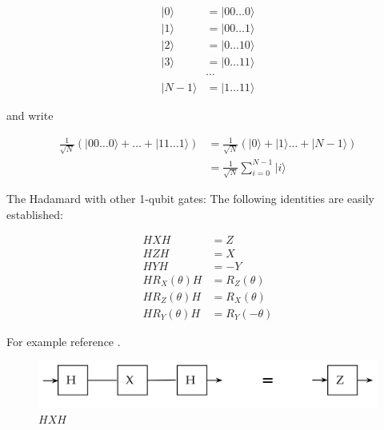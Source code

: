 \documentclass[main.tex]{subfiles}
\begin{document}
    $$
    \begin{aligned}
        |0\rangle & =|00 \ldots 0\rangle\\
        |1\rangle & =|00 \ldots 1\rangle\\
        |2\rangle & =|0 \ldots 10\rangle\\
        |3\rangle & =|0 \ldots 11\rangle\\
                & \cdots \\
        |N-1\rangle & =|1 \ldots 11\rangle
    \end{aligned}
    $$
    
    and write
    
    $$
    \begin{aligned}
    \frac{1}{\sqrt{N}}(|00 \ldots 0\rangle+\ldots+|11 \ldots 1\rangle) &=\frac{1}{\sqrt{N}}(|0\rangle+|1\rangle \ldots+|N-1\rangle) \\
    &=\frac{1}{\sqrt{N}} \sum_{i=0}^{N-1}|i\rangle
    \end{aligned}
    $$
    
    The Hadamard with other 1-qubit gates: The following identities are easily established:
    
    $$
    \begin{aligned}
    H X H &=Z \\
    H Z H &=X \\
    H Y H &=-Y \\
    H R_{X}(\theta) H &=R_{Z}(\theta) \\
    H R_{Z}(\theta) H &=R_{X}(\theta) \\
    H R_{Y}(\theta) H &=R_{Y}(-\theta)
    \end{aligned}
    $$
    
    For example reference .
    
    \begin{figure}
        \centering
        \includegraphics[width=5in]{notes/figs/n08/08gate7.png}
        \caption{$H X H$}
        \label{fig:08gate7}
    \end{figure}
    
\end{document}
